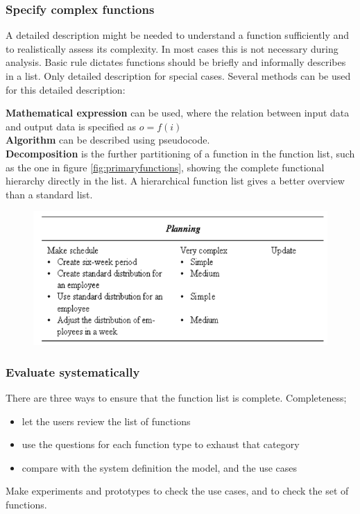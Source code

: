 \subsubsection{Specify complex functions}
A detailed description might be needed to understand a function sufficiently and to realistically assess its complexity. In most cases this is not necessary during analysis. Basic rule dictates functions should be briefly and informally describes in a list. Only detailed description for special cases. Several methods can be used for this detailed description:

\noindent \textbf{Mathematical expression} can be used, where the relation between input data and output data is specified as $o = f(i)$
\\\textbf{Algorithm} can be described using pseudocode.
\\\textbf{Decomposition} is the further partitioning of a function in the function list, such as the one in figure \ref{fig:primaryfunctions}, showing the complete functional hierarchy directly in the list. A hierarchical function list gives a better overview than a standard list.
\begin{figure}[H]
    \centering
    \includegraphics[width=.5\textwidth]{figures/decomposition.png}
\end{figure}

\subsubsection{Evaluate systematically}
There are three ways to ensure that the function list is complete.
Completeness; 
\begin{itemize}
    \item let the users review the list of functions
    \item use the questions for each function type to exhaust that category
    \item compare with the system definition the model, and the use cases
\end{itemize}

Make experiments and prototypes to check the use cases, and to check the set of functions.

